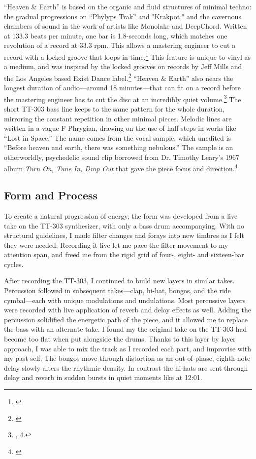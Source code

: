 \documentclass[12pt,twoside]{reedthesis}
\begin{document}
``Heaven {\&} Earth'' is based on the organic and fluid structures of minimal techno: the gradual progressions on ``Phylyps Trak'' and "Krakpot," and the cavernous chambers of sound in the work of artists like Monolake and DeepChord. Written at 133.3 beats per minute, one bar is 1.8-seconds long, which matches one revolution of a record at 33.3 rpm. This allows a mastering engineer to cut a record with a locked groove that loops in time.\footnote{\cite{AardvarkRecordMastering}} This feature is unique to vinyl as a medium, and was inspired by the locked grooves on records by Jeff Mills and the Los Angeles based Exist Dance label.\footnote{\cite{upaboveTryingTo1993}} ``Heaven {\&} Earth'' also nears the longest duration of audio---around 18 minutes---that can fit on a record before the mastering engineer has to cut the disc at an incredibly quiet volume.\footnote{\cite{hooseTurningTablesEngineering2018}, 4.} The short TT-303 bass line keeps to the same pattern for the whole duration, mirroring the constant repetition in other minimal pieces. Melodic lines are written in a vague F Phrygian, drawing on the use of half steps in works like ``Lost in Space.'' The name comes from the vocal sample, which unedited is ``Before heaven and earth, there was something nebulous.'' The sample is an otherworldly, psychedelic sound clip borrowed from Dr. Timothy Leary's 1967 album \emph{Turn On, Tune In, Drop Out} that gave the piece focus and direction.\footnote{\cite{learyTurnOn1967}}

\subsection{Form and Process}

To create a natural progression of energy, the form was developed from a live take on the TT-303 synthesizer, with only a bass drum accompanying. With no structural guidelines, I made filter changes and forays into new timbres as I felt they were needed. Recording it live let me pace the filter movement to my attention span, and freed me from the rigid grid of four-, eight- and sixteen-bar cycles.

After recording the TT-303, I continued to build new layers in similar takes. Percussion followed in subsequent takes---clap, hi-hat, bongos, and the ride cymbal---each with unique modulations and undulations. Most percussive layers were recorded with live application of reverb and delay effects as well.  Adding the percussion solidified the energetic path of the piece, and it allowed me to replace the bass with an alternate take. I found my the original take on the TT-303 had become too flat when put alongside the drums. Thanks to this layer by layer approach, I was able to mix the track as I recorded each part, and improvise with my past self. The bongos move through distortion as an out-of-phase, eighth-note delay slowly alters the rhythmic density. In contrast the hi-hats are sent through delay and reverb in sudden bursts in quiet moments like at 12:01.
\end{document}
